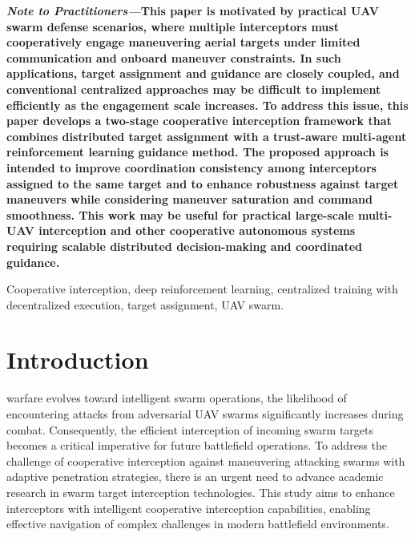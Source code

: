 \documentclass[lettersize,journal]{IEEEtran}
\begin{document}
{\linespread{0.9}\selectfont
\hspace*{0.0em}\textbf{\textit{Note to Practitioners—}}\textbf{This paper is motivated by practical UAV swarm defense scenarios, where multiple interceptors must cooperatively engage maneuvering aerial targets under limited communication and onboard maneuver constraints. In such applications, target assignment and guidance are closely coupled, and conventional centralized approaches may be difficult to implement efficiently as the engagement scale increases. To address this issue, this paper develops a two-stage cooperative interception framework that combines distributed target assignment with a trust-aware multi-agent reinforcement learning guidance method. The proposed approach is intended to improve coordination consistency among interceptors assigned to the same target and to enhance robustness against target maneuvers while considering maneuver saturation and command smoothness. This work may be useful for practical large-scale multi-UAV interception and other cooperative autonomous systems requiring scalable distributed decision-making and coordinated guidance.}\par\vspace{0.5\baselineskip}
}

\begin{IEEEkeywords}
Cooperative interception, deep reinforcement learning, centralized training with decentralized
execution, target assignment, UAV swarm.
\end{IEEEkeywords}


\section{Introduction}
\label{sec:introduction}
 warfare evolves toward intelligent swarm operations, the likelihood of
encountering attacks from adversarial UAV swarms significantly increases during combat.
Consequently, the efficient interception of incoming swarm targets becomes a critical
imperative for future battlefield operations.
To address the challenge of cooperative interception against maneuvering attacking swarms with
adaptive penetration strategies, there is an urgent need to advance academic research in swarm
target interception technologies.
This study aims to enhance interceptors with intelligent cooperative interception capabilities,
enabling effective navigation of complex challenges in modern battlefield environments.
\end{document}
